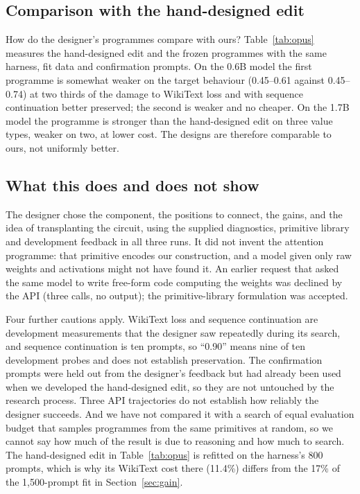 \documentclass[11pt]{article}
\begin{document}
\subsection{Comparison with the hand-designed edit}

How do the designer's programmes compare with ours? Table~\ref{tab:opus} measures the hand-designed edit and the frozen programmes with the same harness, fit data and confirmation prompts. On the 0.6B model the first programme is somewhat weaker on the target behaviour (0.45--0.61 against 0.45--0.74) at two thirds of the damage to WikiText loss and with sequence continuation better preserved; the second is weaker and no cheaper. On the 1.7B model the programme is stronger than the hand-designed edit on three value types, weaker on two, at lower cost. The designs are therefore comparable to ours, not uniformly better.

\subsection{What this does and does not show}

The designer chose the component, the positions to connect, the gains, and the idea of transplanting the circuit, using the supplied diagnostics, primitive library and development feedback in all three runs. It did not invent the attention programme: that primitive encodes our construction, and a model given only raw weights and activations might not have found it. An earlier request that asked the same model to write free-form code computing the weights was declined by the API (three calls, no output); the primitive-library formulation was accepted.

Four further cautions apply. WikiText loss and sequence continuation are development measurements that the designer saw repeatedly during its search, and sequence continuation is ten prompts, so ``0.90'' means nine of ten development probes and does not establish preservation. The confirmation prompts were held out from the designer's feedback but had already been used when we developed the hand-designed edit, so they are not untouched by the research process. Three API trajectories do not establish how reliably the designer succeeds. And we have not compared it with a search of equal evaluation budget that samples programmes from the same primitives at random, so we cannot say how much of the result is due to reasoning and how much to search. The hand-designed edit in Table~\ref{tab:opus} is refitted on the harness's 800 prompts, which is why its WikiText cost there (11.4\%) differs from the 17\% of the 1{,}500-prompt fit in Section~\ref{sec:gain}.
\end{document}
